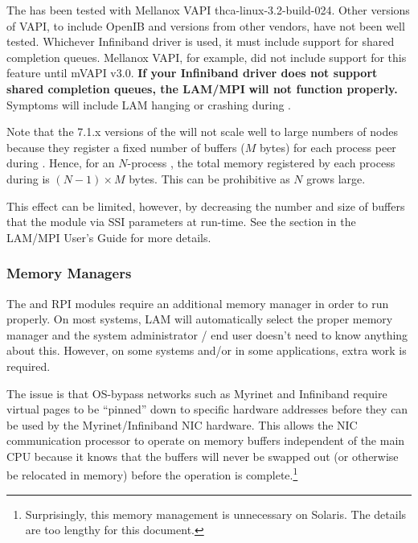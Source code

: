 The   has been tested with Mellanox VAPI
thca-linux-3.2-build-024.  Other versions of VAPI, to include OpenIB
and versions from other vendors, have not been well tested.
%
%
Whichever Infiniband driver is used, it must include support for
shared completion queues.  Mellanox VAPI, for example, did not include
support for this feature until mVAPI v3.0.  {\bf If your Infiniband
  driver does not support shared completion queues, the LAM/MPI}
  {\bf will not function properly.}  Symptoms will
include LAM hanging or crashing during .
%


Note that the 7.1.x versions of the   will not scale
well to large numbers of nodes because they register a fixed number of
buffers ($M$ bytes) for each process peer during
.  Hence, for an $N$-process
, the total memory registered by each
process during  is $(N - 1) \times M$ bytes.
This can be prohibitive as $N$ grows large.

This effect can be limited, however, by decreasing the number and size
of buffers that the   module via SSI parameters at
run-time.  See the   section in the LAM/MPI User's
Guide for more details.



\subsubsection{Memory Managers}

The  and  RPI modules require an additional memory
manager in order to run properly.  On most systems, LAM will
automatically select the proper memory manager and the system
administrator / end user doesn't need to know anything about this.
However, on some systems and/or in some applications, extra work is
required.

The issue is that OS-bypass networks such as Myrinet and Infiniband
require virtual pages to be ``pinned'' down to specific hardware
addresses before they can be used by the Myrinet/Infiniband NIC
hardware.  This allows the NIC communication processor to operate on
memory buffers independent of the main CPU because it knows that the
buffers will never be swapped out (or otherwise be relocated in
memory) before the operation is complete.\footnote{Surprisingly, this
  memory management is unnecessary on Solaris.  The details are too
  lengthy for this document.}

